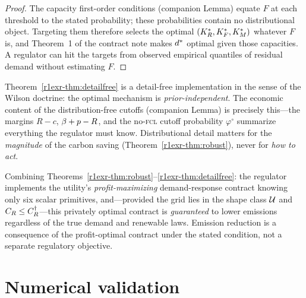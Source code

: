 \begin{proof}
The capacity first-order conditions (companion Lemma) equate $F$ at each threshold
to the stated probability; these probabilities contain no distributional object.
Targeting them therefore selects the optimal $(K_R^{*},K_F^{*},K_M^{*})$ whatever $F$ is,
and Theorem~1 of the contract note makes $d^{*}$ optimal given those capacities.
A regulator can hit the targets from observed empirical quantiles of residual
demand without estimating $F$.
\end{proof}

\begin{remark}
Theorem~\ref{r1exr-thm:detailfree} is a detail-free implementation in the sense of the
Wilson doctrine: the optimal mechanism is \emph{prior-independent}. The economic
content of the distribution-free cutoffs (companion Lemma) is precisely this---the
margins $R-c$, $\beta+p-R$, and the no-\textsc{fcl} cutoff probability $\varphi^{\circ}$
summarize everything
the regulator must know. Distributional detail matters for the \emph{magnitude} of
the carbon saving (Theorem~\ref{r1exr-thm:robust}), never for \emph{how to act}.
\end{remark}

\begin{corollary}
Combining Theorems~\ref{r1exr-thm:robust}--\ref{r1exr-thm:detailfree}: the regulator implements
the utility's \emph{profit-maximizing} demand-response contract knowing only six
scalar primitives, and---provided the grid lies in the shape class $\mathcal U$ and
$C_R\le C_R^{\dagger}$---this privately optimal contract is \emph{guaranteed} to
lower emissions regardless of the true demand and renewable laws. Emission
reduction is a consequence of the profit-optimal contract under the stated
condition, not a separate regulatory objective.
\end{corollary}

\section{Numerical validation}\label{r1exr-sec:num}

